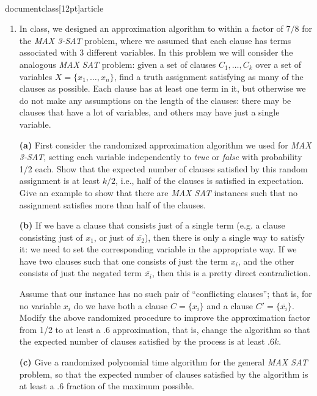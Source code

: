 \\documentclass[12pt]{article}
\begin{document}
\begin{enumerate}
{}


\item 

In class, we designed an approximation algorithm to within
a factor of $7/8$ for the {\em MAX 3-SAT} problem,
where we assumed  that each clause has terms
associated with 3 different variables.
In this problem we will consider the analogous {\em MAX SAT} problem:
given a set of clauses $C_1,\ldots, C_k$  over a set of variables
$X=\{x_1,\ldots, x_n\}$, find a truth assignment satisfying as many of
the clauses as possible. Each clause has at least one term in it,
but otherwise we do not make any assumptions on the length of
the clauses: there may be clauses that have a lot of variables, and
others may have just a single variable.

\medskip
{\bf (a)} First consider the randomized approximation algorithm we used for
{\em MAX 3-SAT}, setting each variable independently to {\em true} or
{\em false} with probability 1/2 each. Show that the expected number
of clauses satisfied by this random assignment is at least $k/2$, i.e.,
half of the clauses is satisfied in expectation. Give an example to show
that there are {\em MAX SAT} instances such that no assignment satisfies more
than half of the clauses.

\medskip
{\bf (b)} If we have a clause that consists just of a single
term (e.g. a clause consisting just of $x_1$, or just of $\overline{x_2}$),
then there is only a single way to satisfy it:
we need to set the corresponding variable in the appropriate way.
If we have two clauses such that one consists of just
the term $x_i$, and the other consists of just the negated term
$\overline{x_i}$, then this is a pretty direct contradiction.

Assume that our instance has no such pair of ``conflicting clauses'';
that is, for no variable $x_i$
do we have both a clause $C=\{x_i\}$ and a clause $C'=\{\overline{x_i}\}$.
Modify the above randomized procedure to improve the approximation factor
from 1/2 to at least a .6 approximation, that is, change the algorithm so
that the expected number of clauses satisfied by the process is at least $.6k$.

\medskip
{\bf (c)} Give a randomized polynomial time algorithm for the general
{\em MAX SAT} problem, so that the expected number of clauses satisfied
by the algorithm is at least a .6 fraction of the maximum possible.


\end{enumerate}
\end{document}
